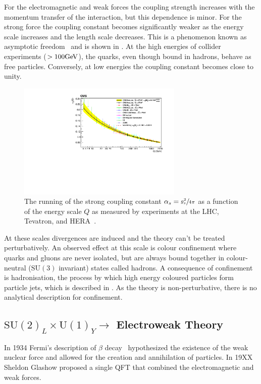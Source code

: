 For the electromagnetic and weak forces the coupling strength increases with the momentum transfer of the interaction, but this dependence is minor.
For the strong force the coupling constant becomes significantly weaker as the energy scale increases and the length scale decreases.
This is a phenomenon known as asymptotic freedom~\cite{gross1973} and is shown in .
At the high energies of collider experiments ($ > 100 \GeV$), the quarks, even though bound in hadrons, behave as free particles.
Conversely, at low energies the coupling constant becomes close to unity.
\begin{figure}[h]
	\centering
	\includegraphics[width=0.7\textwidth]{Figures/standard_model/running}
	\caption{The running of the strong coupling constant $\alpha_s = \sfrac{g_s^2}{4\pi}$ as a function of the energy scale $Q$ as measured by experiments at the LHC, Tevatron, and HERA~\cite{CMSRunning}.}
	\label{fig:asymptotic_freedom}
\end{figure}
At these scales divergences are induced and the theory can't be treated perturbatively.
An observed effect at this scale is colour confinement where quarks and gluons are never isolated, but are always bound together in colour-neutral ($\text{SU}(3)$ invariant) states called hadrons.
A consequence of confinement is hadronisation, the process by which high energy coloured particles form particle jets, which is described in .
As the theory is non-perturbative, there is no analytical description for confinement.

\subsection{\texorpdfstring{$\text{SU}(2)_L \times \text{U}(1)_Y \rightarrow$}{SU(2)xSU(1)-} Electroweak Theory}
\label{sec:electroweak}

In 1934 Fermi's description of $\beta$ decay~\cite{Fermi1934} hypothesized the existence of the weak nuclear force and allowed for the creation and annihilation of particles.
In 19XX Sheldon Glashow proposed a single QFT that combined the electromagnetic and weak forces.


